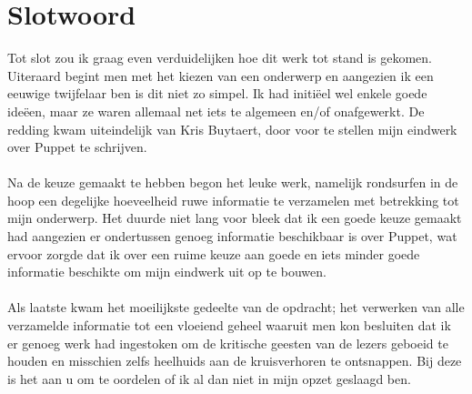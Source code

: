 \chapter*{Slotwoord}
Tot slot zou ik graag even verduidelijken hoe dit werk tot stand is gekomen. Uiteraard begint men met het kiezen van een onderwerp en aangezien ik een eeuwige twijfelaar ben is dit niet zo simpel. Ik had initi\"{e}el wel enkele goede ide\"{e}en, maar ze waren allemaal net iets te algemeen en/of onafgewerkt. De redding kwam uiteindelijk van Kris Buytaert, door voor te stellen mijn eindwerk over Puppet te schrijven.\\\\
Na de keuze gemaakt te hebben begon het leuke werk, namelijk rondsurfen in de hoop een degelijke hoeveelheid ruwe informatie te verzamelen met betrekking tot mijn onderwerp. Het duurde niet lang voor bleek dat ik een goede keuze gemaakt had aangezien er ondertussen genoeg informatie beschikbaar is over Puppet, wat ervoor zorgde dat ik over een ruime keuze aan goede en iets minder goede informatie beschikte om mijn eindwerk uit op te bouwen.\\\\
Als laatste  kwam het moeilijkste gedeelte van de opdracht; het verwerken van alle verzamelde informatie tot een vloeiend geheel waaruit men kon besluiten dat ik er genoeg werk had ingestoken om de kritische geesten van de lezers geboeid te houden en misschien zelfs heelhuids aan de kruisverhoren te ontsnappen. Bij deze is het aan u om te oordelen of ik al dan niet in mijn opzet geslaagd ben.

